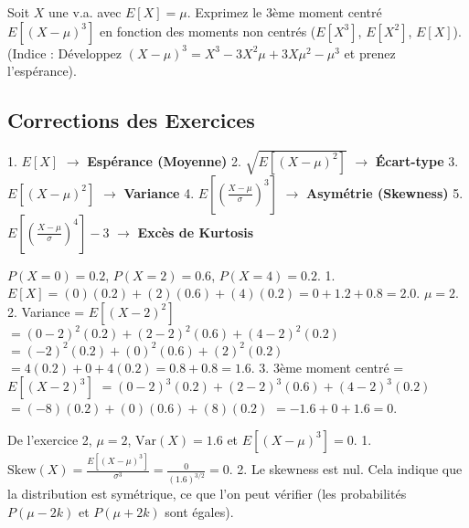 \begin{exercicebox}
Soit $X$ une v.a. avec $E[X] = \mu$.
Exprimez le 3ème moment centré $E[(X-\mu)^3]$ en fonction des moments non centrés ($E[X^3]$, $E[X^2]$, $E[X]$).
(Indice : Développez $(X-\mu)^3 = X^3 - 3X^2\mu + 3X\mu^2 - \mu^3$ et prenez l'espérance).
\end{exercicebox}

\subsection{Corrections des Exercices}


\begin{correctionbox}
1.  $E[X]$ $\rightarrow$ \textbf{Espérance (Moyenne)}
2.  $\sqrt{E[(X-\mu)^2]}$ $\rightarrow$ \textbf{Écart-type}
3.  $E[(X-\mu)^2]$ $\rightarrow$ \textbf{Variance}
4.  $E[\left(\frac{X-\mu}{\sigma}\right)^3]$ $\rightarrow$ \textbf{Asymétrie (Skewness)}
5.  $E[\left(\frac{X-\mu}{\sigma}\right)^4] - 3$ $\rightarrow$ \textbf{Excès de Kurtosis}
\end{correctionbox}

\begin{correctionbox}
$P(X=0)=0.2$, $P(X=2)=0.6$, $P(X=4)=0.2$.
1.  $E[X] = (0)(0.2) + (2)(0.6) + (4)(0.2) = 0 + 1.2 + 0.8 = 2.0$. $\mu=2$.
2.  Variance = $E[(X-2)^2]$
    $= (0-2)^2(0.2) + (2-2)^2(0.6) + (4-2)^2(0.2)$
    $= (-2)^2(0.2) + (0)^2(0.6) + (2)^2(0.2)$
    $= 4(0.2) + 0 + 4(0.2) = 0.8 + 0.8 = 1.6$.
3.  3ème moment centré = $E[(X-2)^3]$
    $= (0-2)^3(0.2) + (2-2)^3(0.6) + (4-2)^3(0.2)$
    $= (-8)(0.2) + (0)(0.6) + (8)(0.2)$
    $= -1.6 + 0 + 1.6 = 0$.
\end{correctionbox}

\begin{correctionbox}
De l'exercice 2, $\mu=2$, $\text{Var}(X) = 1.6$ et $E[(X-\mu)^3] = 0$.
1.  $\text{Skew}(X) = \frac{E[(X-\mu)^3]}{\sigma^3} = \frac{0}{(1.6)^{3/2}} = 0$.
2.  Le skewness est nul. Cela indique que la distribution est symétrique, ce que l'on peut vérifier (les probabilités $P(\mu-2k)$ et $P(\mu+2k)$ sont égales).
\end{correctionbox}


